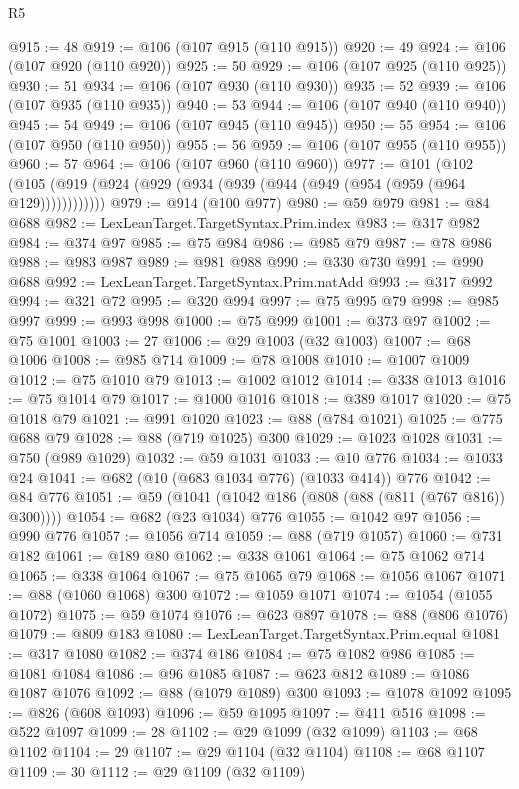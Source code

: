 \begin{lexlean}{R5}
\begin{coremodule}
@915 := 48
@919 := @106 (@107 @915 (@110 @915))
@920 := 49
@924 := @106 (@107 @920 (@110 @920))
@925 := 50
@929 := @106 (@107 @925 (@110 @925))
@930 := 51
@934 := @106 (@107 @930 (@110 @930))
@935 := 52
@939 := @106 (@107 @935 (@110 @935))
@940 := 53
@944 := @106 (@107 @940 (@110 @940))
@945 := 54
@949 := @106 (@107 @945 (@110 @945))
@950 := 55
@954 := @106 (@107 @950 (@110 @950))
@955 := 56
@959 := @106 (@107 @955 (@110 @955))
@960 := 57
@964 := @106 (@107 @960 (@110 @960))
@977 := @101
    (@102 (@105 (@919 (@924 (@929 (@934 (@939 (@944 (@949 (@954 (@959 (@964 @129))))))))))))
@979 := @914 (@100 @977)
@980 := @59 @979
@981 := @84 @688
@982 := LexLeanTarget.TargetSyntax.Prim.index
@983 := @317 @982
@984 := @374 @97
@985 := @75 @984
@986 := @985 @79
@987 := @78 @986
@988 := @983 @987
@989 := @981 @988
@990 := @330 @730
@991 := @990 @688
@992 := LexLeanTarget.TargetSyntax.Prim.natAdd
@993 := @317 @992
@994 := @321 @72
@995 := @320 @994
@997 := @75 @995 @79
@998 := @985 @997
@999 := @993 @998
@1000 := @75 @999
@1001 := @373 @97
@1002 := @75 @1001
@1003 := 27
@1006 := @29 @1003 (@32 @1003)
@1007 := @68 @1006
@1008 := @985 @714
@1009 := @78 @1008
@1010 := @1007 @1009
@1012 := @75 @1010 @79
@1013 := @1002 @1012
@1014 := @338 @1013
@1016 := @75 @1014 @79
@1017 := @1000 @1016
@1018 := @389 @1017
@1020 := @75 @1018 @79
@1021 := @991 @1020
@1023 := @88 (@784 @1021)
@1025 := @775 @688 @79
@1028 := @88 (@719 @1025) @300
@1029 := @1023 @1028
@1031 := @750 (@989 @1029)
@1032 := @59 @1031
@1033 := @10 @776
@1034 := @1033 @24
@1041 := @682 (@10 (@683 @1034 @776) (@1033 @414)) @776
@1042 := @84 @776
@1051 := @59 (@1041 (@1042 @186 (@808 (@88 (@811 (@767 @816)) @300))))
@1054 := @682 (@23 @1034) @776
@1055 := @1042 @97
@1056 := @990 @776
@1057 := @1056 @714
@1059 := @88 (@719 @1057)
@1060 := @731 @182
@1061 := @189 @80
@1062 := @338 @1061
@1064 := @75 @1062 @714
@1065 := @338 @1064
@1067 := @75 @1065 @79
@1068 := @1056 @1067
@1071 := @88 (@1060 @1068) @300
@1072 := @1059 @1071
@1074 := @1054 (@1055 @1072)
@1075 := @59 @1074
@1076 := @623 @897
@1078 := @88 (@806 @1076)
@1079 := @809 @183
@1080 := LexLeanTarget.TargetSyntax.Prim.equal
@1081 := @317 @1080
@1082 := @374 @186
@1084 := @75 @1082 @986
@1085 := @1081 @1084
@1086 := @96 @1085
@1087 := @623 @812
@1089 := @1086 @1087 @1076
@1092 := @88 (@1079 @1089) @300
@1093 := @1078 @1092
@1095 := @826 (@608 @1093)
@1096 := @59 @1095
@1097 := @411 @516
@1098 := @522 @1097
@1099 := 28
@1102 := @29 @1099 (@32 @1099)
@1103 := @68 @1102
@1104 := 29
@1107 := @29 @1104 (@32 @1104)
@1108 := @68 @1107
@1109 := 30
@1112 := @29 @1109 (@32 @1109)

\end{coremodule}
\end{lexlean}
